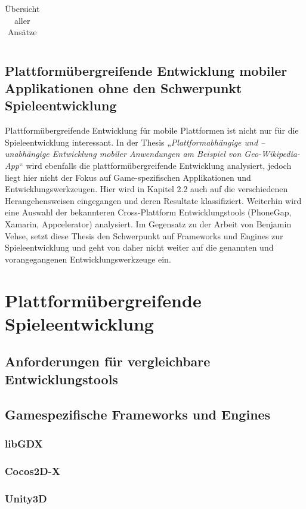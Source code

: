 \begin{table}[htbp]
{\begin{tabular}{|c|c|p{8cm}|p{6cm}|p{}|}
		\end{tabular}
	}
	\caption{Übersicht aller Ansätze}
	\label{table_all_approaches}
\end{table}

\section{Plattformübergreifende Entwicklung mobiler Applikationen ohne den Schwerpunkt Spieleentwicklung}
Plattformübergreifende Entwicklung für mobile Plattformen ist nicht nur für die Spieleentwicklung interessant.
In der Thesis „\textit{Plattformabhängige und –unabhängige Entwicklung mobiler Anwendungen am Beispiel von Geo-Wikipedia-App}“ \citep{cross_plattform_development_vehse} wird ebenfalls die plattformübergreifende Entwicklung analysiert, jedoch liegt hier nicht der Fokus auf Game-spezifischen Applikationen und Entwicklungswerkzeugen. Hier wird in Kapitel 2.2 auch auf die verschiedenen Herangehensweisen eingegangen und deren Resultate klassifiziert. Weiterhin wird eine Auswahl der bekannteren Cross-Plattform Entwicklungstools (PhoneGap, Xamarin, Appcelerator) analysiert. Im Gegensatz zu der Arbeit von Benjamin Vehse, setzt diese Thesis den Schwerpunkt auf Frameworks und Engines zur Spieleentwicklung und geht von daher nicht weiter auf die genannten und vorangegangenen Entwicklungswerkzeuge ein.


\chapter{Plattformübergreifende Spieleentwicklung}
\section{Anforderungen für vergleichbare Entwicklungstools}
\section{Gamespezifische Frameworks und Engines}
\subsection{libGDX}
\subsection{Cocos2D-X}
\subsection{Unity3D}
